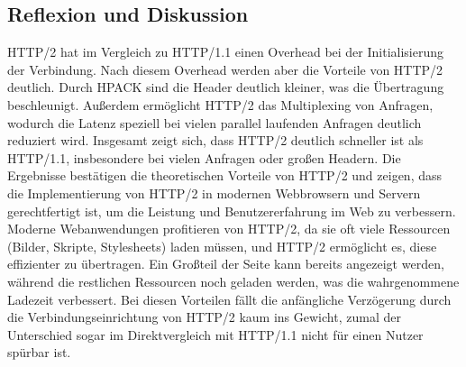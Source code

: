 \subsection{Reflexion und Diskussion}

HTTP/2 hat im Vergleich zu HTTP/1.1 einen Overhead bei der Initialisierung der Verbindung.
Nach diesem Overhead werden aber die Vorteile von HTTP/2 deutlich.
Durch HPACK sind die Header deutlich kleiner, was die Übertragung beschleunigt.
Außerdem ermöglicht HTTP/2 das Multiplexing von Anfragen, wodurch die Latenz speziell bei vielen parallel laufenden Anfragen deutlich reduziert wird.
Insgesamt zeigt sich, dass HTTP/2 deutlich schneller ist als HTTP/1.1, insbesondere bei vielen Anfragen oder großen Headern.
Die Ergebnisse bestätigen die theoretischen Vorteile von HTTP/2 und zeigen, dass die Implementierung von HTTP/2 in modernen Webbrowsern und Servern gerechtfertigt ist, um die Leistung und Benutzererfahrung im Web zu verbessern.
Moderne Webanwendungen profitieren von HTTP/2, da sie oft viele Ressourcen (Bilder, Skripte, Stylesheets) laden müssen, und HTTP/2 ermöglicht es, diese effizienter zu übertragen.
Ein Großteil der Seite kann bereits angezeigt werden, während die restlichen Ressourcen noch geladen werden, was die wahrgenommene Ladezeit verbessert.
Bei diesen Vorteilen fällt die anfängliche Verzögerung durch die Verbindungseinrichtung von HTTP/2 kaum ins Gewicht, zumal der Unterschied sogar im Direktvergleich mit HTTP/1.1 nicht für einen Nutzer spürbar ist.